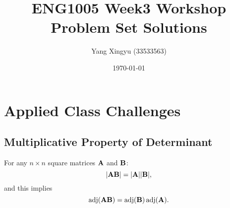 \documentclass[12pt,a4paper]{article}
\begin{document}
\title{ENG1005 Week3 Workshop Problem Set Solutions}
\author{Yang Xingyu (33533563)}
\date{\today}
\maketitle

\section*{Applied Class Challenges}
\subsection*{Multiplicative Property of Determinant}
\begin{theorem}
For any \( n \times n \) square matrices \(\mathbf{A}\) and \(\mathbf{B}\):
\[
|\mathbf{A}\mathbf{B}| = |\mathbf{A}||\mathbf{B}|,
\]
and this implies
\[
\operatorname{adj}(\mathbf{A}\mathbf{B}) = \operatorname{adj}(\mathbf{B}) \operatorname{adj}(\mathbf{A}).
\]
\end{theorem}
\end{document}
